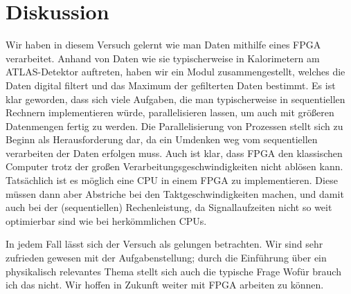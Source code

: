 \section{Diskussion}
Wir haben in diesem Versuch gelernt wie man Daten mithilfe eines FPGA verarbeitet.
Anhand von Daten wie sie typischerweise in Kalorimetern am ATLAS-Detektor auftreten, haben wir ein Modul zusammengestellt, welches die Daten digital filtert und das Maximum der gefilterten Daten bestimmt.
Es ist klar geworden, dass sich viele Aufgaben, die man typischerweise in sequentiellen Rechnern implementieren würde, parallelisieren lassen, um auch mit größeren Datenmengen fertig zu werden.
Die Parallelisierung von Prozessen stellt sich zu Beginn als Herausforderung dar, da ein Umdenken weg vom sequentiellen verarbeiten der Daten erfolgen muss.
Auch ist klar, dass FPGA den klassischen Computer trotz der großen Verarbeitungsgeschwindigkeiten nicht ablösen kann.
Tatsächlich ist es möglich eine CPU in einem FPGA zu implementieren.
Diese müssen dann aber Abstriche bei den Taktgeschwindigkeiten machen, und damit auch bei der (sequentiellen) Rechenleistung, da Signallaufzeiten nicht so weit optimierbar sind wie bei herkömmlichen CPUs.

In jedem Fall lässt sich der Versuch als gelungen betrachten.
Wir sind sehr zufrieden gewesen mit der Aufgabenstellung; durch die Einführung über ein physikalisch relevantes Thema stellt sich auch die typische Frage \glqq Wofür brauch ich das\grqq{} nicht.
Wir hoffen in Zukunft weiter mit FPGA arbeiten zu können.
